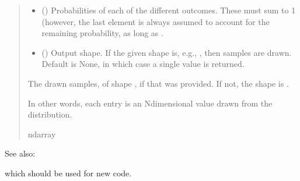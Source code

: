 \documentclass[letterpaper,10pt,english]{sphinxmanual}
\begin{document}
\begin{fulllineitems}
\begin{quote}
\begin{description}
\begin{itemize}
\item {} 
\sphinxAtStartPar
{} (\sphinxstyleliteralemphasis{\sphinxupquote{, }}) \textendash{} Probabilities of each of the  different outcomes.  These
must sum to 1 (however, the last element is always assumed to
account for the remaining probability, as long as
.

\item {} 
\sphinxAtStartPar
{} (\sphinxstyleliteralemphasis{\sphinxupquote{, }}) \textendash{} Output shape.  If the given shape is, e.g., , then
 samples are drawn.  Default is None, in which case a
single value is returned.

\end{itemize}

\sphinxAtStartPar

\sphinxAtStartPar
{} \textendash{} The drawn samples, of shape , if that was provided.  If not,
the shape is .

\sphinxAtStartPar
In other words, each entry  is an N\sphinxhyphen{}dimensional
value drawn from the distribution.


\sphinxAtStartPar
ndarray

\end{description}\end{quote}


\begin{sphinxseealso}{See also:}
\begin{description}
\sphinxAtStartPar
which should be used for new code.

\end{description}



\end{sphinxseealso}
\end{fulllineitems}
\end{document}
